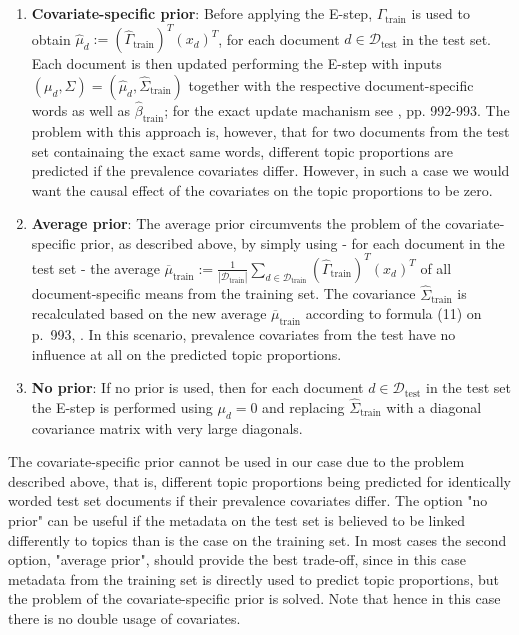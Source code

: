 \begin{enumerate}
\item \textbf{Covariate-specific prior}: Before applying the E-step, $\hat{\Gamma}_{\text{train}}$ is used to obtain $\hat{\mu}_d := (\hat{\Gamma}_{\text{train}})^T(x_d)^T$, for each document $d \in \mathcal{D}_{\text{test}}$ in the test set. Each document is then updated performing the E-step with inputs $({\mu}_d, \Sigma) = (\hat{\mu}_d, \hat{\Sigma}_{\text{train}})$ together with the respective document-specific words as well as $\hat{\beta}_{\text{train}}$; for the exact update machanism see \cite{roberts2013structural}, pp. 992-993. The problem with this approach is, however, that for two documents from the test set containaing the exact same words, different topic proportions are predicted if the prevalence covariates differ. However, in such a case we would want the causal effect of the covariates on the topic proportions to be zero.
\item \textbf{Average prior}: The average prior circumvents the problem of the covariate-specific prior, as described above, by simply using - for each document in the test set - the average $\overline{\mu}_{\text{train}} := \frac{1}{|\mathcal{D}_{\text{train}}|}\sum_{d \in \mathcal{D}_{\text{train}}} (\hat{\Gamma}_{\text{train}})^T(x_d)^T$ of all document-specific means from the training set. The covariance $\hat{\Sigma}_{\text{train}}$ is recalculated based on the new average $\overline{\mu}_{\text{train}}$ according to formula (11) on p.\ 993, \cite{roberts2013structural}. In this scenario, prevalence covariates from the test have no influence at all on the predicted topic proportions. 
\item \textbf{No prior}: If no prior is used, then for each document $d \in \mathcal{D}_{\text{test}}$ in the test set the E-step is performed using $\mu_d=0$ and replacing $\hat{\Sigma}_{\text{train}}$ with a diagonal covariance matrix with very large diagonals.
\end{enumerate}
The covariate-specific prior cannot be used in our case due to the problem described above, that is, different topic proportions being predicted for identically worded test set documents if their prevalence covariates differ. The option "no prior" can be useful if the metadata on the test set is believed to be linked differently to topics than is the case on the training set. In most cases the second option, "average prior", should provide the best trade-off, since in this case metadata from the training set is directly used to predict topic proportions, but the problem of the covariate-specific prior is solved. Note that hence in this case there is no double usage of covariates.

